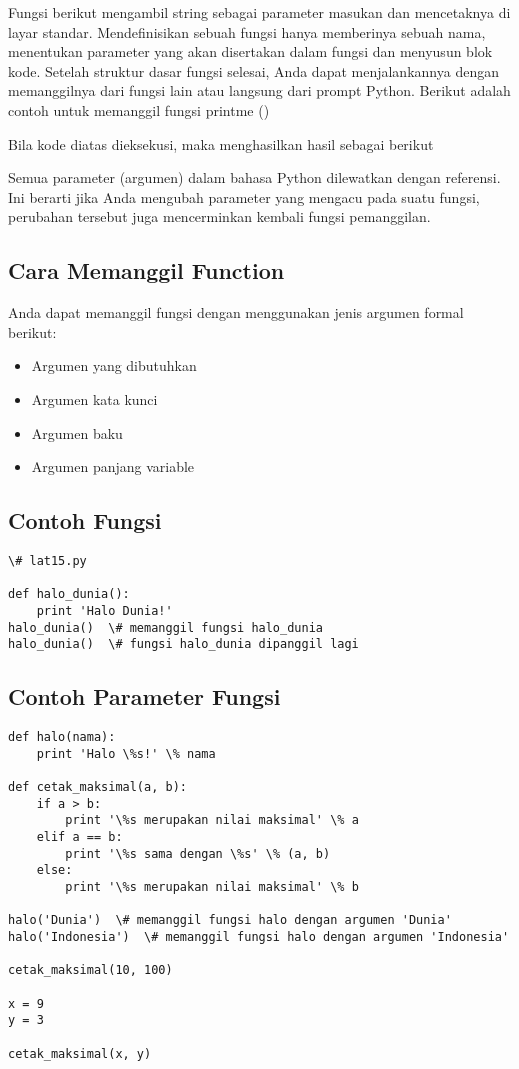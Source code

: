 Fungsi berikut mengambil string sebagai parameter masukan dan mencetaknya di layar standar.
Mendefinisikan sebuah fungsi hanya memberinya sebuah nama, menentukan parameter yang akan disertakan dalam fungsi dan menyusun blok kode. Setelah struktur dasar fungsi selesai, Anda dapat menjalankannya dengan memanggilnya dari fungsi lain atau langsung dari prompt Python. Berikut adalah contoh untuk memanggil fungsi printme ()

Bila kode diatas dieksekusi, maka menghasilkan hasil sebagai berikut 

Semua parameter (argumen) dalam bahasa Python dilewatkan dengan referensi. Ini berarti jika Anda mengubah parameter yang mengacu pada suatu fungsi, perubahan tersebut juga mencerminkan kembali fungsi pemanggilan. 

\subsection{Cara Memanggil Function}
Anda dapat memanggil fungsi dengan menggunakan jenis argumen formal berikut: 
\begin{itemize}
\item
Argumen yang dibutuhkan 
\item
Argumen kata kunci 
\item
Argumen baku 
\item
Argumen panjang variable 
\end{itemize}

\subsection{Contoh Fungsi}
\begin{verbatim}
\# lat15.py

def halo_dunia():
    print 'Halo Dunia!'
halo_dunia()  \# memanggil fungsi halo_dunia
halo_dunia()  \# fungsi halo_dunia dipanggil lagi
\end{verbatim}

\subsection{Contoh Parameter Fungsi}
\begin{verbatim}
def halo(nama):
    print 'Halo \%s!' \% nama

def cetak_maksimal(a, b):
    if a > b:
        print '\%s merupakan nilai maksimal' \% a
    elif a == b:
        print '\%s sama dengan \%s' \% (a, b)
    else:
        print '\%s merupakan nilai maksimal' \% b

halo('Dunia')  \# memanggil fungsi halo dengan argumen 'Dunia'
halo('Indonesia')  \# memanggil fungsi halo dengan argumen 'Indonesia'

cetak_maksimal(10, 100)

x = 9
y = 3

cetak_maksimal(x, y)

\end{verbatim}




